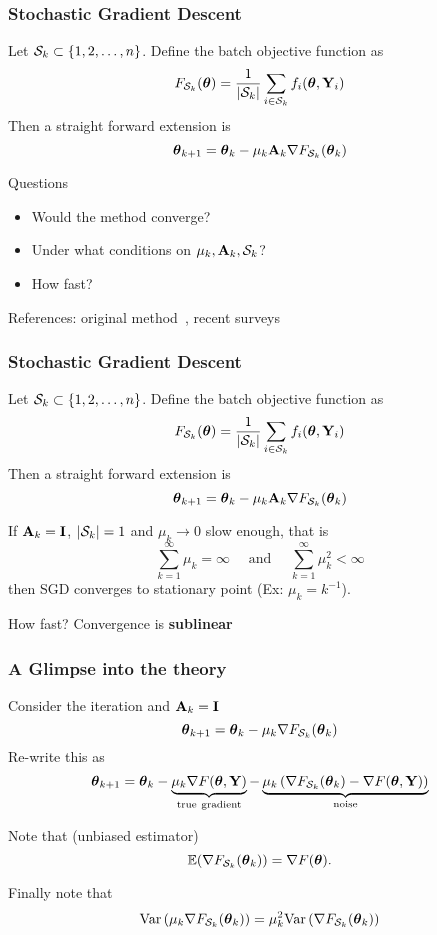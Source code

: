 \documentclass[12pt,fleqn,beamer]{beamer}
\begin{document}
\begin{frame}[fragile]\frametitle{Stochastic Gradient Descent}

Let ${\cal S}_k \subset \{1,2,\ldots,n\}$. Define the batch objective function as 
$$ F_{{\cal S}_k}({\boldsymbol \theta}) = \frac{1}{|{\cal S}_k|} \sum_{i \in {\cal S}_k} f_i({\boldsymbol \theta},{\bf Y}_i) $$
Then a straight forward extension  is
$$ {\boldsymbol \theta}_{k+1} = {\boldsymbol \theta}_k - \mu_k {\bf A}_k  \nabla F_{{\cal S}_k}({\boldsymbol \theta}_k) $$


Questions
\begin{itemize}
\item Would the method converge?
\item Under what conditions on $\mu_k,{\bf A}_k,{\cal S}_k$?
\item How fast?
\end{itemize}

References: original method~\cite{RobbinsMonro1951}, recent surveys~\cite{Bottou2012,Bertsekas2015,bottou2016optimization}
\end{frame}

\begin{frame}[fragile]\frametitle{Stochastic Gradient Descent}

Let ${\cal S}_k \subset \{1,2,\ldots,n\}$. Define the batch objective function as 
$$ F_{{\cal S}_k}({\boldsymbol \theta}) = \frac{1}{|{\cal S}_k|} \sum_{i \in {\cal S}_k} f_i({\boldsymbol \theta},{\bf Y}_i) $$
Then a straight forward extension   is
$$ {\boldsymbol \theta}_{k+1} = {\boldsymbol \theta}_k - \mu_k {\bf A}_k  \nabla F_{{\cal S}_k}({\boldsymbol \theta}_k) $$

\bigskip
\pause

If ${\bf A}_k = {\bf I}$, $|{\cal S}_k|=1$ and $\mu_k \rightarrow 0$ slow enough, that is
$$ \sum_{k=1}^{\infty} \mu_k= \infty \quad \text{ and } \quad \sum_{k=1}^{\infty} \mu_k^2 < \infty$$
then SGD converges to stationary point \pause (Ex: $\mu_k = k^{-1}$).

\bigskip
\pause

How fast? Convergence is {\bf sublinear}

\end{frame}


\begin{frame}\frametitle{A Glimpse into the theory}
	Consider the iteration and ${\bf A}_k={\bf I}$
	$$ 
	{\boldsymbol \theta}_{k+1} = {\boldsymbol \theta}_k - \mu_k  \nabla F_{{\cal S}_k}({\boldsymbol \theta}_k) 
	$$
	\pause
	Re-write this as
	$$ 
	{\boldsymbol \theta}_{k+1} = {\boldsymbol \theta}_k - \underbrace{\mu_k \nabla F({\boldsymbol \theta},{\bf Y})}_{\rm true\ gradient} -  \underbrace{\mu_k \left ( \nabla F_{{\cal S}_k}({\boldsymbol \theta}_k)  - \nabla F ({\boldsymbol \theta},{\bf Y})\right)}_{\rm noise}
	$$
	
	\pause
	
	Note that (unbiased estimator)
	$$
	 {\mathbb{E}} (\nabla F_{{\cal S}_k}({\boldsymbol \theta}_k)) = \nabla F ({\boldsymbol \theta}).
	$$
	
	\pause
	
	Finally note that
	$$
		{\rm Var}\left( \mu_k \nabla F_{{\cal S}_k}({\boldsymbol \theta}_k) \right) = \mu_k^2 {\rm Var}\left( \nabla F_{{\cal S}_k}({\boldsymbol \theta}_k) \right)
	$$
\end{frame}
\end{document}
